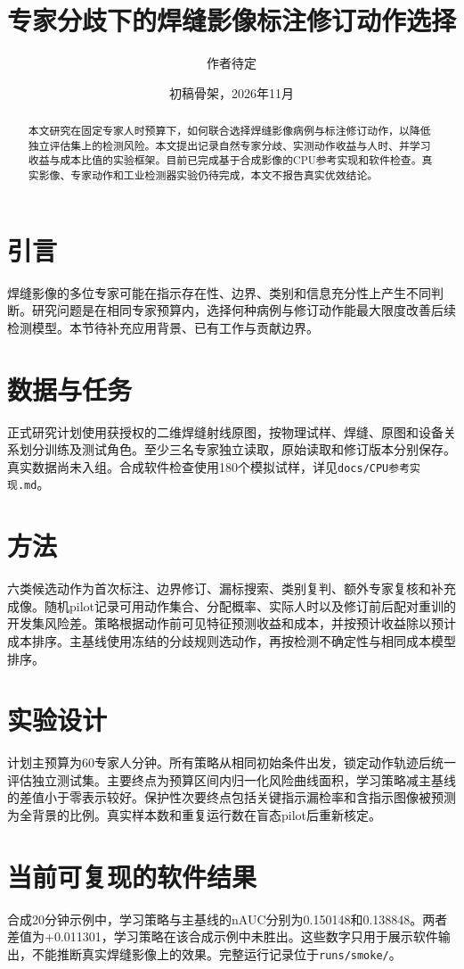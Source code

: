 \documentclass[11pt]{article}
\title{专家分歧下的焊缝影像标注修订动作选择}
\author{作者待定}
\date{初稿骨架，2026年11月}
\begin{document}
\maketitle
\begin{abstract}
本文研究在固定专家人时预算下，如何联合选择焊缝影像病例与标注修订动作，以降低独立评估集上的检测风险。本文提出记录自然专家分歧、实测动作收益与人时、并学习收益与成本比值的实验框架。目前已完成基于合成影像的CPU参考实现和软件检查。真实影像、专家动作和工业检测器实验仍待完成，本文不报告真实优效结论。
\end{abstract}

\section{引言}
焊缝影像的多位专家可能在指示存在性、边界、类别和信息充分性上产生不同判断。研究问题是在相同专家预算内，选择何种病例与修订动作能最大限度改善后续检测模型。本节待补充应用背景、已有工作与贡献边界。

\section{数据与任务}
正式研究计划使用获授权的二维焊缝射线原图，按物理试样、焊缝、原图和设备关系划分训练及测试角色。至少三名专家独立读取，原始读取和修订版本分别保存。真实数据尚未入组。合成软件检查使用180个模拟试样，详见\texttt{docs/CPU参考实现.md}。

\section{方法}
六类候选动作为首次标注、边界修订、漏标搜索、类别复判、额外专家复核和补充成像。随机pilot记录可用动作集合、分配概率、实际人时以及修订前后配对重训的开发集风险差。策略根据动作前可见特征预测收益和成本，并按预计收益除以预计成本排序。主基线使用冻结的分歧规则选动作，再按检测不确定性与相同成本模型排序。

\section{实验设计}
计划主预算为60专家人分钟。所有策略从相同初始条件出发，锁定动作轨迹后统一评估独立测试集。主要终点为预算区间内归一化风险曲线面积，学习策略减主基线的差值小于零表示较好。保护性次要终点包括关键指示漏检率和含指示图像被预测为全背景的比例。真实样本数和重复运行数在盲态pilot后重新核定。

\section{当前可复现的软件结果}
合成20分钟示例中，学习策略与主基线的nAUC分别为0.150148和0.138848。两者差值为+0.011301，学习策略在该合成示例中未胜出。这些数字只用于展示软件输出，不能推断真实焊缝影像上的效果。完整运行记录位于\texttt{runs/smoke/}。
\end{document}
